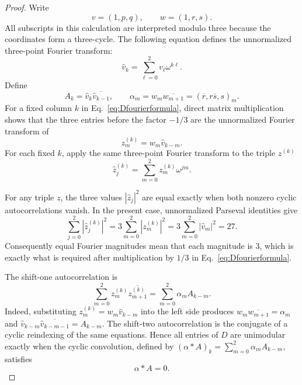 \documentclass[aps,prx,reprint,nofootinbib,twoside,superscriptaddress,longbibliography,floatfix]{revtex4-2}
\theoremstyle{definition}
\begin{document}
\begin{proof}
Write
\begin{equation}
v=(1,p,q),\qquad w=(1,r,s).
\label{eq:vwhat}
\end{equation}
All subscripts in this calculation are interpreted modulo three because the coordinates form a three-cycle.  The following equation defines the unnormalized three-point Fourier transform:
\begin{equation}
\widehat v_k=\sum_{\ell=0}^{2}v_{\ell}\omega^{k\ell}.
\label{eq:vhat-transform}
\end{equation}
Define
\begin{equation}
A_k=\widehat v_k\overline{\widehat v_{k-1}},
\qquad
\alpha_m=w_m\overline{w_{m+1}}
=(\overline r,r\overline s,s)_m.
\label{eq:Aalpha}
\end{equation}
For a fixed column $k$ in Eq.~\eqref{eq:Dfourierformula}, direct matrix multiplication shows that the three entries before the factor $-1/3$ are the unnormalized Fourier transform of
\begin{equation}
z_m^{(k)}=w_m\widehat v_{k-m}.
\label{eq:zk}
\end{equation}
{For each fixed $k$, apply the same three-point Fourier transform to the triple $z^{(k)}$}
\begin{equation}
{\widehat z_j^{(k)}=\sum_{m=0}^{2}z_m^{(k)}\omega^{jm}.}
\label{eq:zhat-transform}
\end{equation}

For any triple $z$, the three values $|\widehat z_j|^2$ are equal exactly when both nonzero cyclic autocorrelations vanish.  In the present case, unnormalized Parseval identities give
\begin{equation}
\sum_{j=0}^{2}|\widehat z_j^{(k)}|^2
=3\sum_{m=0}^{2}|z_m^{(k)}|^2
=3\sum_{m=0}^{2}|\widehat v_m|^2=27.
\label{eq:parseval27}
\end{equation}
Consequently equal Fourier magnitudes mean that each magnitude is $3$, which is exactly what is required after multiplication by $1/3$ in Eq.~\eqref{eq:Dfourierformula}.

The shift-one autocorrelation is
\begin{equation}
\sum_{m=0}^{2}z_m^{(k)}\overline{z_{m+1}^{(k)}}
=\sum_{m=0}^{2}\alpha_m A_{k-m}.
\label{eq:autoconvolution}
\end{equation}
Indeed, substituting $z_m^{(k)}=w_m\widehat v_{k-m}$ into the left side produces $w_m\overline{w_{m+1}}=\alpha_m$ and $\widehat v_{k-m}\overline{\widehat v_{k-m-1}}=A_{k-m}$. The shift-two autocorrelation is the conjugate of a cyclic reindexing of the same equations.  Hence all entries of $D$ are unimodular exactly when the cyclic convolution, defined by $(\alpha*A)_k=\sum_{m=0}^{2}\alpha_mA_{k-m}$, satisfies
\begin{equation}
\alpha*A=0.
\label{eq:alphaconvolutionA}
\end{equation}


\end{proof}
\end{document}
